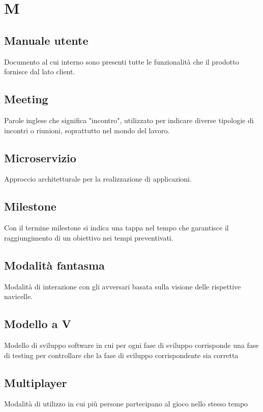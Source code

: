 \section{M}
	\subsection{Manuale utente}
		Documento al cui interno sono presenti tutte le funzionalità che il prodotto fornisce dal lato client.
	\subsection{Meeting}
		Parole inglese che significa "incontro", utilizzato per indicare diverse tipologie di incontri o riunioni, soprattutto nel mondo del lavoro.
	\subsection{Microservizio}
		Approccio architetturale per la realizzazione di applicazioni.
	\subsection{Milestone}  
		Con il termine milestone si indica una tappa nel tempo che garantisce il raggiungimento di un obiettivo nei tempi preventivati.
    \subsection{Modalità fantasma}
        Modalità di interazione con gli avversari basata sulla visione delle rispettive navicelle.
	\subsection{Modello a V}  
		Modello di sviluppo software in cui per ogni fase di sviluppo corrisponde una fase di testing per controllare che la fase di sviluppo corrispondente sia corretta
	\subsection{Multiplayer}
		Modalità di utilizzo in cui più persone partecipano al gioco nello stesso tempo

\newpage